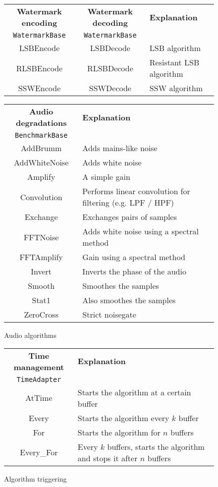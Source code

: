 \begin{figure}[h!]
\centering
\begin{tabular}{|c|c|l|}
\hline
\textbf{Watermark encoding} & \textbf{Watermark decoding} & \textbf{Explanation} \\
\texttt{WatermarkBase} & \texttt{WatermarkBase} & \\
\hline
LSBEncode & LSBDecode & LSB algorithm \\
RLSBEncode & RLSBDecode & Resistant LSB algorithm \\
SSWEncode & SSWDecode & \ac{SSW} algorithm \\
\hline
\end{tabular}

\vspace{1em}

\begin{tabular}{|c|l|}
\hline
\textbf{Audio degradations} & \textbf{Explanation} \\
\texttt{BenchmarkBase} & \\
\hline
AddBrumm & Adds mains-like noise \\
AddWhiteNoise & Adds white noise \\
Amplify & A simple gain \\
Convolution & Performs linear convolution for filtering (e.g. LPF / HPF)\\
Exchange & Exchanges pairs of samples \\
FFTNoise & Adds white noise using a spectral method \\
FFTAmplify & Gain using a spectral method \\
Invert & Inverts the phase of the audio \\
Smooth & Smoothes the samples \\ 
Stat1 & Also smoothes the samples \\
ZeroCross & Strict noisegate\\
\hline
\end{tabular} 
\caption{Audio algorithms}
\label{frameworkclass2}
\end{figure}

\begin{figure}[h!]
\centering
\begin{tabular}{|c|l|}
\hline
\textbf{Time management} & \textbf{Explanation} \\
\texttt{TimeAdapter} & \\
\hline
AtTime & Starts the algorithm at a certain buffer \\
Every & Starts the algorithm every $k$ buffer \\
For & Starts the algorithm for $n$ buffers \\
Every\_For & Every $k$ buffers, starts the algorithm and stops it after $n$ buffers\\
\hline
\end{tabular}
\caption{Algorithm triggering}
\label{frameworkclass3}
\end{figure}


